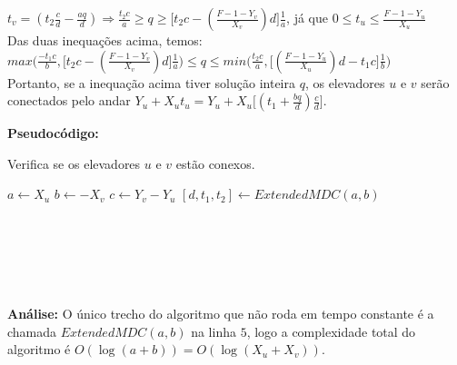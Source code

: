 $t_v = (t_2\frac{c}{d} - \frac{aq}{d}) \Rightarrow \frac{t_2c}{a} \geq q \geq \big[t_2c - (\frac{F-1-Y_v}{X_v})d\big]\frac{1}{a}$, já que $0\leq t_u\leq \frac{F-1-Y_u}{X_u}$
\\

Das duas inequações acima, temos:
\\

$max\Big(\frac{-t_1c}{b}, \big[t_2c - (\frac{F-1-Y_v}{X_v})d\big]\frac{1}{a} \Big) \leq q \leq min\Big(\frac{t_2c}{a}, \big[(\frac{F-1-Y_u}{X_u})d - t_1c\big]\frac{1}{b}  \Big)$
\\

Portanto, se a inequação acima tiver solução inteira $q$, os elevadores $u$ e $v$ serão conectados pelo andar $Y_u+X_ut_u = Y_u+X_u\big[(t_1 + \frac{bq}{d})\frac{c}{d}\big]$.
\clearpage

\textbf{Pseudocódigo:}
\begin{algorithm}
\caption{Verifica se os elevadores $u$ e $v$ estão conexos.}\label{euclid}
\begin{algorithmic}[1]
\State $a \gets X_u$
\State $b \gets -X_v$
\State $c \gets Y_v-Y_u$
\State $[d,t_1,t_2] \gets ExtendedMDC(a,b)$
\\
\State {}
\EndIf
\\
\State {}
\EndIf
\\
\\
\\
\State {}
\EndIf
\\
\State {}

\EndProcedure
\end{algorithmic}
\end{algorithm}

\textbf{Análise:}
O único trecho do algoritmo que não roda em tempo constante é a chamada $ExtendedMDC(a,b)$ na linha $5$, logo a complexidade total do algoritmo é $O(\log(a+b)) = O(\log(X_u+X_v))$.
